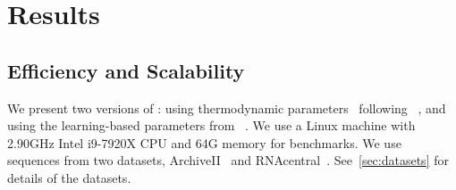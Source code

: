 \vspace{-0.1cm}
\section{Results}
\vspace{-0.1cm}
% 

\subsection{Efficiency and Scalability}



We present two versions of \linearpartition:
{\em \linearpartitionv}
using thermodynamic parameters~\cite{mathews+:1999,Mathews+:2004,xia+:1998}
following \viennarnafold~\cite{lorenz+:2011},
and
{\em \linearpartitionc} using
the learning-based parameters from \contrafold~\cite{do+:2006}.
We use %
a Linux machine 
with 2.90GHz Intel i9-7920X CPU and 64G memory for benchmarks.
We use sequences from two datasets, ArchiveII~\cite{mathews+:1999, sloma+mathews:2016} and RNAcentral~\cite{rnacentral:2017}. See~\ref{sec:datasets} for details of the datasets.




